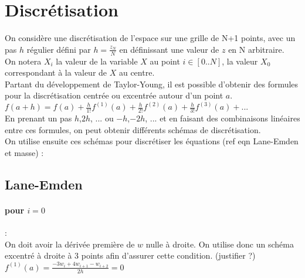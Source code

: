 \documentclass[a4paper,10pt]{article}
\begin{document}
\section{Discrétisation}
%
%

On considère une discrétisation de l'espace sur une grille de N+1 points, avec un pas $h$ régulier défini par $h=\frac{z_N}{N}$ en définissant une valeur de $z$  en N arbitraire.\\
On notera $X_i$ la valeur de la variable $X$ au point $i \in [0..N]$, la valeur $X_0$ correspondant à la valeur de $X$ au centre.\\
Partant du développement de Taylor-Young, il est possible d'obtenir des formules pour la discrétisation centrée ou excentrée autour d'un point $a$.\\
$f(a+h)=f(a)+\frac{h}{1!} f^{(1)} (a) + \frac{h}{2!} f^{(2)} (a) + \frac{h}{3!} f^{(3)} (a) + ...$\\
En prenant un pas $h$,$2h$, ... ou $-h$,$-2h$, ... et en faisant des combinaisons linéaires entre ces formules, on peut obtenir différents schémas de discrétisation.\\
On utilise ensuite ces schémas pour discrétiser les équations (ref eqn Lane-Emden et masse) :
\subsection{Lane-Emden}
\paragraph{pour $i=0$}: \\
On doit avoir la dérivée première de $w$ nulle à droite. On utilise donc un schéma excentré à droite à 3 points afin d'assurer cette condition. (justifier ?)\\
$f^{(1)} (a) = \frac{-3 w_i + 4 w_{i+1} - w_{i+2}}{2 h}=0$
\end{document}
